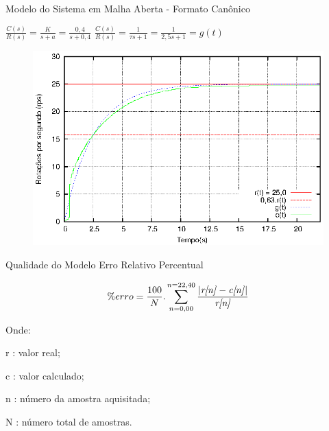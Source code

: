\begin{frame}{Modelo do Sistema em Malha Aberta - Formato Canônico}

$  \frac{C(s)}{R(s)}=\frac{K}{s+a}=\frac{0,4}{s+0,4} $
\hspace{1cm}
$\frac{C(s)}{R(s)} = \frac{1}{\tau s+1} = \frac{1}{2,5 s+1} = g(t)$

\vspace{-0.5cm}
\begin{figure}[!htb]
\center\includegraphics[scale=0.9]{./imagens/acaoMalhaAbertaTau.eps}
\label{fig:acaoMalhaAberTau}

\end{figure}


\end{frame}



\begin{frame}{Qualidade do Modelo}
Erro Relativo Percentual

\begin{equation}
 \% erro = \frac{100}{N} . \sum_{n = 0,00}^{n=22,40} {\frac{| \text{\emph{r[n]}} -\text{\emph{c[n]}} |}{\text{\emph{r[n]}}} } 
\end{equation}

Onde:

\setlength{\parindent}{2cm}
r : valor real; 

c : valor calculado;

n : número da amostra aquisitada;

N : número total de amostras.


\end{frame}



